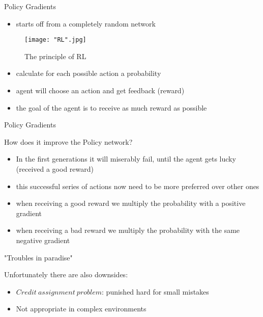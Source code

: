 \documentclass{beamer}
\begin{document}
\begin{frame}{Policy Gradients}

\begin{itemize}
	\item starts off from a completely random network
\end{itemize}

\begin{figure}
	\texttt{[image: "RL".jpg]}
	\caption{The principle of RL}
\end{figure}

\begin{itemize}
	\item calculate for each possible action a probability
	\item agent will choose an action and get feedback (reward)
	\item the goal of the agent is to receive as much reward as possible
\end{itemize}

\end{frame}



\begin{frame}{Policy Gradients}

How does it improve the Policy network? 
\begin{itemize}
	\item In the first generations it will miserably fail, until the agent gets lucky (received a good reward)
	\item this successful series of actions now need to be more preferred over other ones
	\item when receiving a good reward we multiply the probability with a positive gradient
	\item when receiving a bad reward we multiply the probability with the same negative gradient
\end{itemize}

\end{frame}


\begin{frame}{"Troubles in paradise"}

Unfortunately there are also downsides:
\begin{itemize}
	\item $Credit\ assignment\ problem$: punished hard for small mistakes
	\item Not appropriate in complex environments
\end{itemize}

\end{frame}
\end{document}
